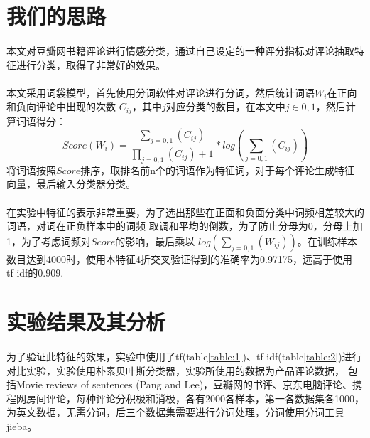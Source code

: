 \documentclass[a4paper,12pt]{article}
\begin{document}
\begin{CJK}{UTF8}{gbsn}
\section{我们的思路}
\paragraph{}
本文对豆瓣网书籍评论进行情感分类，通过自己设定的一种评分指标对评论抽取特征进行分类，取得了非常好的效果。
\paragraph{}
本文采用词袋模型，首先使用分词软件对评论进行分词，然后统计词语$W_{i}$在正向和负向评论中出现的次数
$C_{ij}$，其中$j$对应分类的数目，在本文中$j\in{0,1}$，然后计算词语得分：
\begin{equation}
Score(W_{i}) = \frac {\sum_{j=0,1}^{}(C_{ij})}{\prod_{j=0,1}(C_{ij})+1} * log(\sum_{j=0,1}^{}(C_{ij}))
\end{equation}
将词语按照$Score$排序，取排名前n个的词语作为特征词，对于每个评论生成特征向量，最后输入分类器分类。
\paragraph{}
在实验中特征的表示非常重要，为了选出那些在正面和负面分类中词频相差较大的词语，对词在正负样本中的词频
取调和平均的倒数，为了防止分母为0，分母上加1，为了考虑词频对$Score$的影响，最后乘以
$log(\sum_{j=0,1}(W_{ij}))$。在训练样本数目达到4000时，使用本特征4折交叉验证得到的准确率为0.97175，远高于使用
tf-idf的0.909.
\section{实验结果及其分析}
\paragraph{}
为了验证此特征的效果，实验中使用了tf(table\ref{table:1})、tf-idf(table\ref{table:2})进行对比实验，实验使用朴素贝叶斯分类器，实验所使用的数据为产品评论数据，
包括Movie reviews of sentences (Pang and Lee)，豆瓣网的书评、京东电脑评论、携程网房间评论，每种评论分积极和消极，各有2000各样本，第一各数据集各1000，为英文数据，无需分词，后三个数据集需要进行分词处理，分词使用分词工具jieba。

\begin{CJK}{UTF8}{gbsn}
\begin{table}
\centering


\end{table}
\end{CJK}
\end{CJK}
\end{document}
